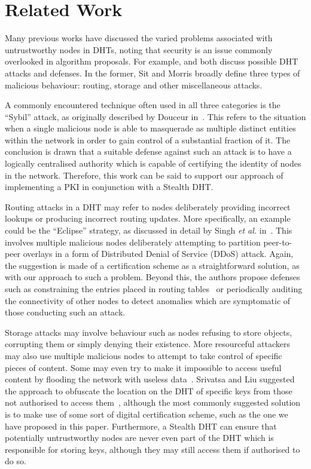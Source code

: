 \documentclass[pdftex,conference,10pt]{IEEEtran}
\begin{document}
\section{Related Work}
\label{sect-related}

Many previous works have discussed the varied problems associated with
untrustworthy nodes in DHTs, noting that security is an issue commonly
overlooked in algorithm proposals. For example, \cite{Sit02Security}
and \cite{Castro02Secure} both discuss possible DHT attacks and
defenses. In the former, Sit and Morris broadly define three types of
malicious behaviour: routing, storage and other miscellaneous attacks.

A commonly encountered technique often used in all three categories is
the ``Sybil'' attack, as originally described by Douceur
in~\cite{Douceur02Sybil}. This refers to the situation when a single
malicious node is able to masquerade as multiple distinct entities
within the network in order to gain control of a substantial fraction
of it. The conclusion is drawn that a suitable defense against such an
attack is to have a logically centralised authority which is capable of
certifying the identity of nodes in the network. Therefore, this work
can be said to support our approach of implementing a PKI in
conjunction with a Stealth DHT.

Routing attacks in a DHT may refer to nodes deliberately providing
incorrect lookups or producing incorrect routing updates. More
specifically, an example could be the ``Eclipse'' strategy, as
discussed in detail by Singh \emph{et al.} in~\cite{Singh06Eclipse}.
This involves multiple malicious nodes deliberately attempting to
partition peer-to-peer overlays in a form of Distributed Denial of
Service (DDoS) attack. Again, the suggestion is made of a certification
scheme as a straightforward solution, as with our approach to such a
problem. Beyond this, the authors propose defenses such as constraining
the entries placed in routing tables~\cite{Castro02Secure} or
periodically auditing the connectivity of other nodes to detect
anomalies which are symptomatic of those conducting such an attack.

Storage attacks may involve behaviour such as nodes refusing to store
objects, corrupting them or simply denying their existence. More
resourceful attackers may also use multiple malicious nodes to attempt
to take control of specific pieces of content. Some may even try to
make it impossible to access useful content by flooding the network
with useless data~\cite{Liang06Index}. Srivatsa and Liu suggested the
approach to obfuscate the location on the DHT of specific keys from
those not authorised to access them~\cite{Srivatsa05Countering},
although the most commonly suggested solution is to make use of some
sort of digital certification scheme, such as the one we have proposed
in this paper. Furthermore, a Stealth DHT can ensure that potentially
untrustworthy nodes are never even part of the DHT which is responsible
for storing keys, although they may still access them if authorised to
do so.
\end{document}
